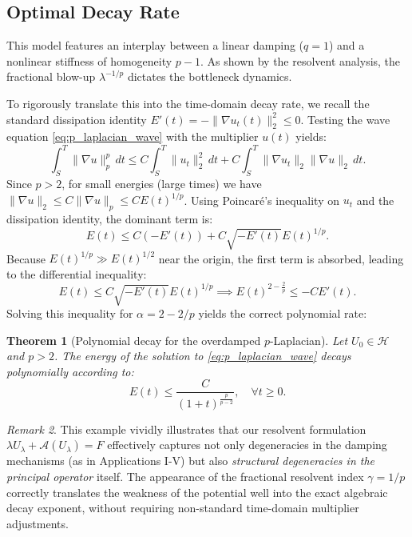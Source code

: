 \documentclass[11pt,reqno]{amsart}
\newtheorem{theorem}{Theorem}[section]
\theoremstyle{remark}
\newtheorem{remark}[theorem]{Remark}
\begin{document}
\subsection{Optimal Decay Rate}

This model features an interplay between a linear damping ($q=1$) and a nonlinear stiffness of homogeneity $p-1$. As shown by the resolvent analysis, the fractional blow-up $\lambda^{-1/p}$ dictates the bottleneck dynamics.

To rigorously translate this into the time-domain decay rate, we recall the standard dissipation identity $E'(t) = -\|\nabla u_t(t)\|_2^2 \le 0$. Testing the wave equation \eqref{eq:p_laplacian_wave} with the multiplier $u(t)$ yields:
\begin{equation*}
    \int_S^T \|\nabla u\|_p^p \, dt \le C \int_S^T \|u_t\|_2^2 \, dt + C \int_S^T \|\nabla u_t\|_2 \|\nabla u\|_2 \, dt.
\end{equation*}
Since $p>2$, for small energies (large times) we have $\|\nabla u\|_2 \le C \|\nabla u\|_p \le C E(t)^{1/p}$. Using Poincaré's inequality on $u_t$ and the dissipation identity, the dominant term is:
\begin{equation*}
    E(t) \le C (-E'(t)) + C \sqrt{-E'(t)} E(t)^{1/p}.
\end{equation*}
Because $E(t)^{1/p} \gg E(t)^{1/2}$ near the origin, the first term is absorbed, leading to the differential inequality:
\begin{equation*}
    E(t) \le C \sqrt{-E'(t)} E(t)^{1/p} \implies E(t)^{2 - \frac{2}{p}} \le -C E'(t).
\end{equation*}
Solving this inequality for $\alpha = 2 - 2/p$ yields the correct polynomial rate:

\begin{theorem}[Polynomial decay for the overdamped $p$-Laplacian]
    Let $U_0 \in \mathcal{H}$ and $p>2$. The energy of the solution to \eqref{eq:p_laplacian_wave} decays polynomially according to:
    \begin{equation}
        E(t) \le \frac{C}{(1+t)^{\frac{p}{p-2}}}, \quad \forall t \ge 0.
    \end{equation}
\end{theorem}

\begin{remark}
This example vividly illustrates that our resolvent formulation $\lambda U_\lambda + \mathcal{A}(U_\lambda) = F$ effectively captures not only degeneracies in the damping mechanisms (as in Applications I-V) but also \textit{structural degeneracies in the principal operator} itself. The appearance of the fractional resolvent index $\gamma = 1/p$ correctly translates the weakness of the potential well into the exact algebraic decay exponent, without requiring non-standard time-domain multiplier adjustments.
\end{remark}
\end{document}
